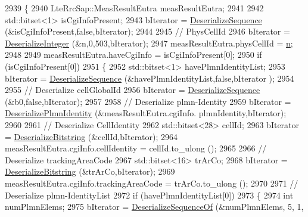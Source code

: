 \begin{DoxyCode}
2939             \{
2940               LteRrcSap::MeasResultEutra measResultEutra;
2941 
2942               std::bitset<1> isCgiInfoPresent;
2943               bIterator = \hyperlink{classns3_1_1Asn1Header_a58c68bb97ba3fe2e8fcdd7c208d672b2}{DeserializeSequence} (&isCgiInfoPresent,\textcolor{keyword}{false},bIterator);
2944 
2945               \textcolor{comment}{// PhysCellId}
2946               bIterator = \hyperlink{classns3_1_1Asn1Header_a49802c9af30018b078150e866b6ecae2}{DeserializeInteger} (&n,0,503,bIterator);
2947               measResultEutra.physCellId = \hyperlink{namespacesample-rng-plot_aeb5ee5c431e338ef39b7ac5431242e1d}{n};
2948 
2949               measResultEutra.haveCgiInfo = isCgiInfoPresent[0];
2950               \textcolor{keywordflow}{if} (isCgiInfoPresent[0])
2951                 \{
2952                   std::bitset<1> havePlmnIdentityList;
2953                   bIterator = \hyperlink{classns3_1_1Asn1Header_a58c68bb97ba3fe2e8fcdd7c208d672b2}{DeserializeSequence} (&havePlmnIdentityList,\textcolor{keyword}{false},bIterator
      );
2954 
2955                   \textcolor{comment}{// Deserialize cellGlobalId}
2956                   bIterator = \hyperlink{classns3_1_1Asn1Header_a58c68bb97ba3fe2e8fcdd7c208d672b2}{DeserializeSequence} (&b0,\textcolor{keyword}{false},bIterator);
2957 
2958                   \textcolor{comment}{// Deserialize plmn-Identity}
2959                   bIterator = \hyperlink{classns3_1_1RrcAsn1Header_a50855ae1c2fda4b56c194497755971d6}{DeserializePlmnIdentity} (&measResultEutra.cgiInfo.
      plmnIdentity,bIterator);
2960 
2961                   \textcolor{comment}{// Deserialize CellIdentity}
2962                   std::bitset<28> cellId;
2963                   bIterator = \hyperlink{classns3_1_1Asn1Header_adb34498b05e8562fba5d40f49578968d}{DeserializeBitstring} (&cellId,bIterator);
2964                   measResultEutra.cgiInfo.cellIdentity = cellId.to\_ulong ();
2965 
2966                   \textcolor{comment}{// Deserialize trackingAreaCode}
2967                   std::bitset<16> trArCo;
2968                   bIterator = \hyperlink{classns3_1_1Asn1Header_adb34498b05e8562fba5d40f49578968d}{DeserializeBitstring} (&trArCo,bIterator);
2969                   measResultEutra.cgiInfo.trackingAreaCode = trArCo.to\_ulong ();
2970 
2971                   \textcolor{comment}{// Deserialize plmn-IdentityList}
2972                   \textcolor{keywordflow}{if} (havePlmnIdentityList[0])
2973                     \{
2974                       \textcolor{keywordtype}{int} numPlmnElems;
2975                       bIterator = \hyperlink{classns3_1_1Asn1Header_a1a7245e05b482df8abade0a060bd0ecc}{DeserializeSequenceOf} (&numPlmnElems, 5, 1, 

\end{DoxyCode}
